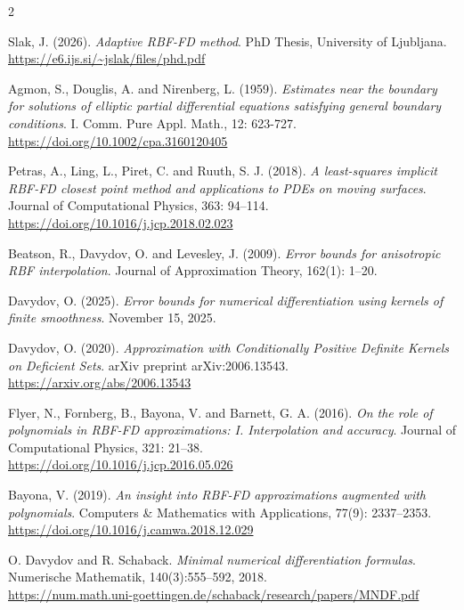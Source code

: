 \documentclass[11pt]{article}
\begin{document}
\pagebreak

\begin{thebibliography}{2}

Slak, J. (2026). \textit{Adaptive RBF-FD method}. PhD Thesis, University of Ljubljana.
\url{https://e6.ijs.si/~jslak/files/phd.pdf}

Agmon, S., Douglis, A. and Nirenberg, L. (1959). \textit{Estimates near the boundary for solutions of elliptic partial differential equations satisfying general boundary conditions}. I. Comm. Pure Appl. Math., 12: 623-727. \\
\url{https://doi.org/10.1002/cpa.3160120405}

Petras, A., Ling, L., Piret, C. and Ruuth, S. J. (2018).
\textit{A least-squares implicit RBF-FD closest point method and applications to PDEs on moving surfaces}.
Journal of Computational Physics, 363: 94--114. \\
\url{https://doi.org/10.1016/j.jcp.2018.02.023}

Beatson, R., Davydov, O. and Levesley, J. (2009).
\textit{Error bounds for anisotropic RBF interpolation}.
Journal of Approximation Theory, 162(1): 1--20.

Davydov, O. (2025).
\textit{Error bounds for numerical differentiation using kernels of finite smoothness}.
November 15, 2025.

Davydov, O. (2020).
\textit{Approximation with Conditionally Positive Definite Kernels on Deficient Sets}.
arXiv preprint arXiv:2006.13543. \\
\url{https://arxiv.org/abs/2006.13543}


Flyer, N., Fornberg, B., Bayona, V. and Barnett, G. A. (2016).
\textit{On the role of polynomials in RBF-FD approximations: I. Interpolation and accuracy}.
Journal of Computational Physics, 321: 21--38. \\
\url{https://doi.org/10.1016/j.jcp.2016.05.026}


Bayona, V. (2019).
\textit{An insight into RBF-FD approximations augmented with polynomials}.
Computers \& Mathematics with Applications, 77(9): 2337--2353. \\
\url{https://doi.org/10.1016/j.camwa.2018.12.029}

O. Davydov and R. Schaback. \textit{Minimal numerical differentiation formulas}. Numerische Mathematik, 140(3):555–592, 2018.\\
\url{https://num.math.uni-goettingen.de/schaback/research/papers/MNDF.pdf}


\end{thebibliography}
\end{document}
